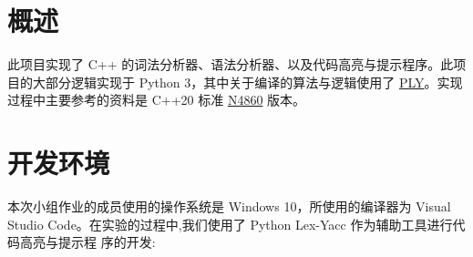 \section{概述}

此项目实现了 C++ 的词法分析器、语法分析器、以及代码高亮与提示程序。此项目的大部分逻辑实现于 Python 3，其中关于编译的算法与逻辑使用了 \href{https://github.com/dabeaz/ply}{PLY}。实现过程中主要参考的资料是 C++20 标准 \href{https://isocpp.org/files/papers/N4860.pdf}{N4860} 版本。

\section{开发环境}

本次小组作业的成员使用的操作系统是 Windows 10，所使用的编译器为 Visual Studio Code。在实验的过程中,我们使用了 Python Lex-Yacc 作为辅助工具进行代码高亮与提示程
序的开发: